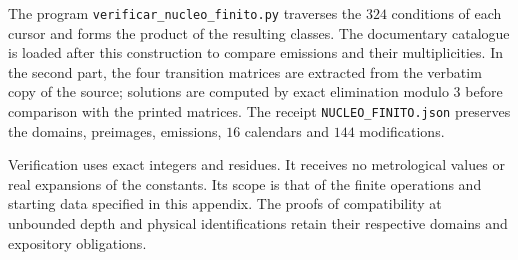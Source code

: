 The program \texttt{verificar\_nucleo\_finito.py} traverses the $324$
conditions of each cursor and forms the product of the resulting classes.
The documentary catalogue is loaded after this construction to
compare emissions and their multiplicities. In the second part,
the four transition matrices are extracted from the verbatim
copy of the source; solutions are computed by exact elimination
modulo $3$ before comparison with the printed matrices. The receipt
\texttt{NUCLEO\_FINITO.json} preserves the domains, preimages,
emissions, $16$ calendars and $144$ modifications.

Verification uses exact integers and residues. It receives no
metrological values or real expansions of the constants. Its scope
is that of the finite operations and starting data specified
in this appendix. The proofs of compatibility at unbounded
depth and physical identifications retain their respective
domains and expository obligations.

